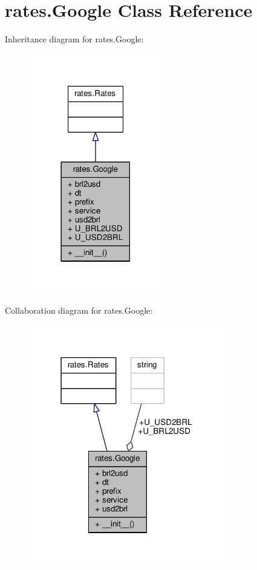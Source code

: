\hypertarget{classrates_1_1_google}{}\section{rates.\+Google Class Reference}
\label{classrates_1_1_google}


Inheritance diagram for rates.\+Google\+:\nopagebreak
\begin{figure}[H]
\begin{center}
\leavevmode
\includegraphics[width=165pt]{classrates_1_1_google__inherit__graph}
\end{center}
\end{figure}


Collaboration diagram for rates.\+Google\+:
\nopagebreak
\begin{figure}[H]
\begin{center}
\leavevmode
\includegraphics[width=243pt]{classrates_1_1_google__coll__graph}
\end{center}
\end{figure}
